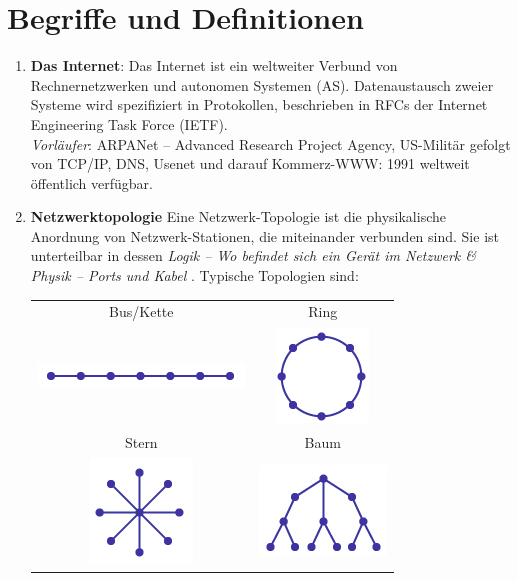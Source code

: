 \documentclass{scrartcl}
\begin{document}
\section{Begriffe und Definitionen}
    \begin{enumerate}[$\bullet$]
        \item \textbf{Das Internet}:
        Das Internet ist ein weltweiter Verbund von Rechnernetzwerken und autonomen Systemen (AS). Datenaustausch zweier Systeme wird spezifiziert in Protokollen, beschrieben in RFCs der Internet Engineering Task Force (IETF).\\
        \textit{Vorläufer}: ARPANet -- Advanced Research Project Agency, US-Militär gefolgt von TCP/IP, DNS, Usenet und darauf Kommerz-WWW: 1991 weltweit öffentlich verfügbar.
        \item \textbf{Netzwerktopologie}
        Eine Netzwerk-Topologie ist die physikalische Anordnung von Netzwerk-Stationen, die miteinander verbunden sind. Sie ist unterteilbar in dessen \textit{Logik -- Wo befindet sich ein Gerät im Netzwerk \& Physik -- Ports und Kabel }. 
        Typische Topologien sind:
        \begin{center}
            \begin{tabular}{c|c}
            Bus/Kette & Ring  \\
            \includegraphics[]{Topologie_Chain.png}     &  \includegraphics[]{Topologie_Ring.png} \\\hline
            Stern     &  Baum \\
            \includegraphics[]{Topologie_Star.png} & \includegraphics[]{Topologie_Tree.png}       \\\hline

\end{tabular}
\end{center}
\end{enumerate}
\end{document}
